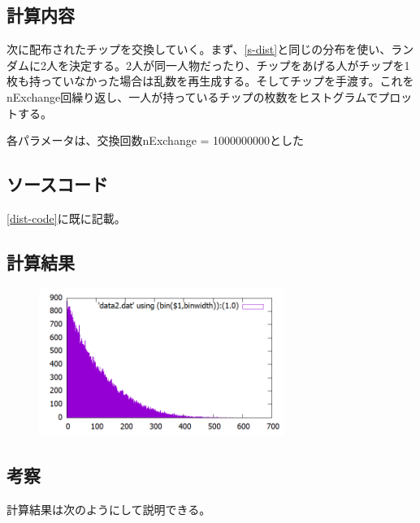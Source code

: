 \documentclass[ %
  platex,%
  papersize,%
  twocolumn,
  landscape
]{jsarticle}
\begin{document}
\subsection{計算内容}
次に配布されたチップを交換していく。まず、\ref{s-dist}と同じの分布を使い、ランダムに2人を決定する。2人が同一人物だったり、チップをあげる人がチップを1枚も持っていなかった場合は乱数を再生成する。そしてチップを手渡す。これをnExchange回繰り返し、一人が持っているチップの枚数をヒストグラムでプロットする。

各パラメータは、交換回数nExchange = 1000000000とした\\

\subsection{ソースコード}
\ref{dist-code}に既に記載。

\subsection{計算結果}
\begin{figure}[H]
\begin{center}
\includegraphics[width=8cm]{../cpp/out/dice_game/data2.png}
\end{center}
\caption{}
\end{figure}

\subsection{考察}
計算結果は次のようにして説明できる。
\end{document}
